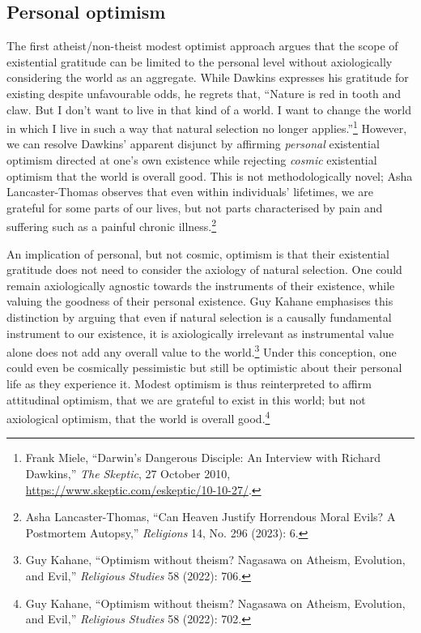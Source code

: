 \subsection{Personal optimism}

The first atheist/non-theist modest optimist approach argues that the
scope of existential gratitude can be limited to the personal level
without axiologically considering the world as an aggregate. While
Dawkins expresses his gratitude for existing despite unfavourable odds,
he regrets that, ``Nature is red in tooth and claw. But I don't want to
live in that kind of a world. I want to change the world in which I live
in such a way that natural selection no longer applies.''\footnote{Frank
  Miele, ``Darwin's Dangerous Disciple: An Interview with Richard
  Dawkins,'' \emph{The Skeptic}, 27 October 2010,
  \url{https://www.skeptic.com/eskeptic/10-10-27/}.} However, we can
resolve Dawkins' apparent disjunct by affirming \emph{personal}
existential optimism directed at one's own existence while rejecting
\emph{cosmic} existential optimism that the world is overall good. This
is not methodologically novel; Asha Lancaster-Thomas observes that even
within individuals' lifetimes, we are grateful for some parts of our
lives, but not parts characterised by pain and suffering such as a
painful chronic illness.\footnote{Asha Lancaster-Thomas, ``Can Heaven
  Justify Horrendous Moral Evils? A Postmortem Autopsy,''
  \emph{Religions} 14, No. 296 (2023): 6.}

An implication of personal, but not cosmic, optimism is that their
existential gratitude does not need to consider the axiology of natural
selection. One could remain axiologically agnostic towards the
instruments of their existence, while valuing the goodness of their
personal existence. Guy Kahane emphasises this distinction by arguing
that even if natural selection is a causally fundamental instrument to
our existence, it is axiologically irrelevant as instrumental value
alone does not add any overall value to the world.\footnote{Guy Kahane,
  ``Optimism without theism? Nagasawa on Atheism, Evolution, and Evil,''
  \emph{Religious Studies} 58 (2022): 706.} Under this conception, one
could even be cosmically pessimistic but still be optimistic about their
personal life as they experience it. Modest optimism is thus
reinterpreted to affirm attitudinal optimism, that we are grateful to
exist in this world; but not axiological optimism, that the world is
overall good.\footnote{Guy Kahane, ``Optimism without theism? Nagasawa on Atheism, Evolution, and Evil,'' \emph{Religious Studies} 58 (2022): 702.}

